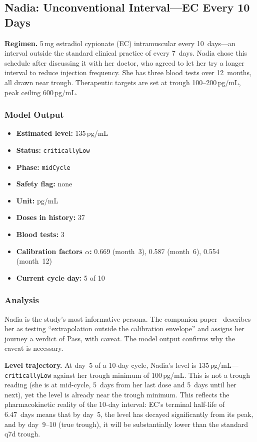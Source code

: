 \documentclass[11pt,a4paper]{article}
\newcommand{\good}[1]{\textcolor{ok}{#1}}
\newcommand{\code}[1]{\texttt{\small #1}}
\begin{document}
\subsection{Nadia: Unconventional Interval---EC Every 10 Days}
\label{sec:nadia}

\textbf{Regimen.} 5\,mg estradiol cypionate (EC) intramuscular every
10~days---an interval outside the standard clinical practice of every
7~days. Nadia chose this schedule after discussing it with her doctor, who
agreed to let her try a longer interval to reduce injection frequency. She
has three blood tests over 12~months, all drawn near trough. Therapeutic
targets are set at trough 100--200\,pg/mL, peak ceiling 600\,pg/mL.

\subsubsection{Model Output}

\begin{itemize}[nosep,leftmargin=1.4em]
\item \textbf{Estimated level:} 135\,pg/mL
\item \textbf{Status:} \code{criticallyLow}
\item \textbf{Phase:} \code{midCycle}
\item \textbf{Safety flag:} none
\item \textbf{Unit:} pg/mL
\item \textbf{Doses in history:} 37
\item \textbf{Blood tests:} 3
\item \textbf{Calibration factors $\alpha$:} 0.669 (month~3), 0.587
  (month~6), 0.554 (month~12)
\item \textbf{Current cycle day:} 5 of 10
\end{itemize}

\subsubsection{Analysis}

Nadia is the study's most informative persona. The companion
paper~\cite{xtux} describes her as testing ``extrapolation outside the
calibration envelope'' and assigns her journey a verdict of \good{Pass, with
caveat.} The model output confirms why the caveat is necessary.

\textbf{Level trajectory.} At day~5 of a 10-day cycle, Nadia's level is
135\,pg/mL---\code{criticallyLow} against her trough minimum of
100\,pg/mL. This is not a trough reading (she is at mid-cycle, 5~days from
her last dose and 5~days until her next), yet the level is already near the
trough minimum. This reflects the pharmacokinetic reality of the 10-day
interval: EC's terminal half-life of 6.47~days means that by day~5, the
level has decayed significantly from its peak, and by day~9--10 (true
trough), it will be substantially lower than the standard q7d trough.
\end{document}

